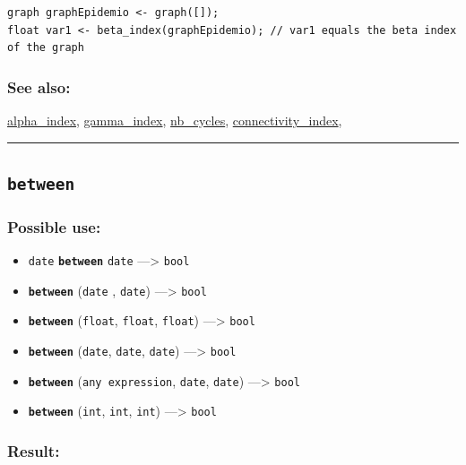 \documentclass[]{book}
\providecommand{\tightlist}{%
  \setlength{\itemsep}{0pt}\setlength{\parskip}{0pt}}
\theoremstyle{definition}
\theoremstyle{definition}
\theoremstyle{definition}
\theoremstyle{remark}
\begin{document}
\begin{verbatim}
graph graphEpidemio <- graph([]);  
float var1 <- beta_index(graphEpidemio); // var1 equals the beta index of the graph
\end{verbatim}

\subsubsection{See also:}\label{see-also-43}

\href{operators-a-to-a.html\#alpha_index}{alpha\_index},
\href{operators-d-to-h.html\#gamma_index}{gamma\_index},
\href{operators-n-to-r.html\#nb_cycles}{nb\_cycles},
\href{operators-b-to-c.html\#connectivity_index}{connectivity\_index},

\begin{center}\rule{0.5\linewidth}{\linethickness}\end{center}

\subsection{\texorpdfstring{\texttt{between}}{between}}\label{between}

\subsubsection{Possible use:}\label{possible-use-67}

\begin{itemize}
\tightlist
\item
  \texttt{date} \textbf{\texttt{between}} \texttt{date}
  ---\textgreater{} \texttt{bool}
\item
  \textbf{\texttt{between}} (\texttt{date} , \texttt{date})
  ---\textgreater{} \texttt{bool}
\item
  \textbf{\texttt{between}} (\texttt{float}, \texttt{float},
  \texttt{float}) ---\textgreater{} \texttt{bool}
\item
  \textbf{\texttt{between}} (\texttt{date}, \texttt{date},
  \texttt{date}) ---\textgreater{} \texttt{bool}
\item
  \textbf{\texttt{between}} (\texttt{any\ expression}, \texttt{date},
  \texttt{date}) ---\textgreater{} \texttt{bool}
\item
  \textbf{\texttt{between}} (\texttt{int}, \texttt{int}, \texttt{int})
  ---\textgreater{} \texttt{bool}
\end{itemize}

\subsubsection{Result:}\label{result-66}
\end{document}
